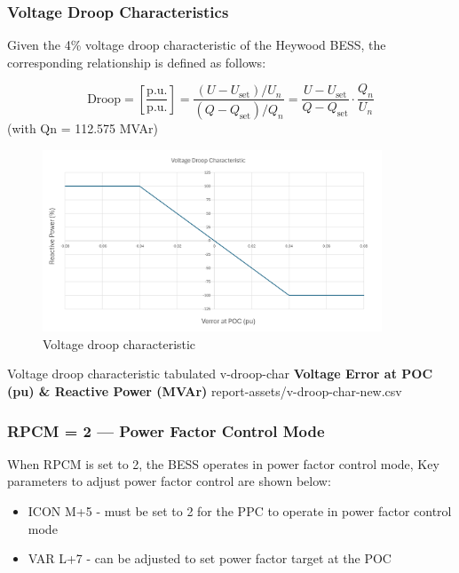 \documentclass{../grid-link-report}
\begin{document}
\subsubsection{Voltage Droop Characteristics}


Given the 4\% voltage droop characteristic of the Heywood BESS, the corresponding relationship is defined as follows:


\[
\text{Droop} =  \left[ \frac{\text{p.u.}}{\text{p.u.}} \right] = \frac{(U - U_{\text{set}})/U_n}{(Q - Q_{\text{set}})/Q_n} = \frac{U - U_{\text{set}}}{Q - Q_{\text{set}}} \cdot \frac{Q_n}{U_n}
\]
 (with Qn = 112.575 MVAr)



	
	
	\begin{figure}[H]
		\centering
		\includegraphics[width=0.9\textwidth]{report-assets/images/vdroop-char.png}
		\caption{Voltage droop characteristic}
		\label{fig:vdroop-char}
	\end{figure}
	
	{Voltage droop characteristic tabulated}
	{v-droop-char}
	{\bfseries \color{white}Voltage Error at POC (pu) & \bfseries \color{white}Reactive Power (MVAr)}
	{report-assets/v-droop-char-new.csv}
	
	\subsubsection{RPCM = 2 — Power Factor Control Mode}

	When RPCM is set to 2, the BESS operates in power factor control mode, Key parameters to adjust power factor control are shown below:
	
	\begin{itemize}
		\item ICON M+5 - must be set to 2 for the PPC to operate in power factor control mode
		\item VAR L+7 - can be adjusted to set power factor target at the POC
	\end{itemize} 
	
\end{document}
